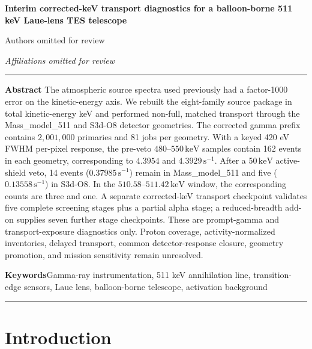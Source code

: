 \documentclass[11pt]{article}
\newcommand{\keV}{\ensuremath{\,\mathrm{keV}}}
\newcommand{\cps}{\ensuremath{\,\mathrm{s^{-1}}}}
\begin{document}
\thispagestyle{fancy}
\begin{flushleft}
{\LARGE\bfseries Interim corrected-keV transport diagnostics for a balloon-borne 511 keV Laue-lens TES telescope\par}
\vspace{1.1em}
{\large Authors omitted for review\par}
\vspace{0.3em}
{\normalsize\itshape Affiliations omitted for review\par}
\end{flushleft}
\vspace{0.7em}
\noindent\rule{\textwidth}{0.4pt}
\vspace{0.5em}

\noindent\textbf{Abstract}\hspace{0.7em}
The atmospheric source spectra used previously had a factor-1000 error on the
kinetic-energy axis. We rebuilt the eight-family source package in total
kinetic-energy keV and performed non-full, matched transport through the
Mass\_model\_511 and S3d-O8 detector geometries. The corrected gamma prefix
contains $2{,}001{,}000$ primaries and 81 jobs per geometry. With a keyed
420 eV FWHM per-pixel response, the pre-veto $480$--$550\keV$ samples contain
162 events in each geometry, corresponding to $4.3954$ and $4.3929\cps$.
After a 50\keV{} active-shield veto, 14 events
($0.37985\cps$) remain in Mass\_model\_511 and five
($0.13558\cps$) in S3d-O8. In the $510.58$--$511.42\keV$ window, the
corresponding counts are three and one. A separate corrected-keV transport
checkpoint validates five complete screening stages plus a partial alpha stage;
a reduced-breadth add-on supplies seven further stage checkpoints. These are
prompt-gamma and transport-exposure diagnostics only. Proton coverage,
activity-normalized inventories, delayed transport, common detector-response
closure, geometry promotion, and mission sensitivity remain unresolved.

\vspace{0.7em}
\noindent\textbf{Keywords}\hspace{0.7em}Gamma-ray instrumentation, 511 keV annihilation line, transition-edge sensors, Laue lens, balloon-borne telescope, activation background

\vspace{0.3em}
\noindent\rule{\textwidth}{0.4pt}
\vspace{1.0em}

\section{Introduction}
\label{sec:introduction}
\end{document}
